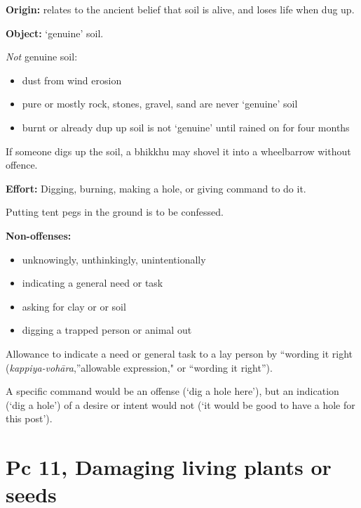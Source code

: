 \begin{multicols}{2}

\textbf{Origin:} relates to the ancient belief that soil is alive, and
loses life when dug up.

\textbf{Object:} `genuine' soil.

\emph{Not} genuine soil:

\begin{itemize}
\tightlist
\item
  dust from wind erosion
\item
  pure or mostly rock, stones, gravel, sand are never `genuine' soil
\item
  burnt or already dup up soil is not `genuine' until rained on for four
  months
\end{itemize}

If someone digs up the soil, a bhikkhu may shovel it into a wheelbarrow
without offence.

\textbf{Effort:} Digging, burning, making a hole, or giving command to
do it.

Putting tent pegs in the ground is to be confessed.

\columnbreak

\textbf{Non-offenses:}

\begin{itemize}
\tightlist
\item
  unknowingly, unthinkingly, unintentionally
\item
  indicating a general need or task
\item
  asking for clay or or soil
\item
  digging a trapped person or animal out
\end{itemize}

Allowance to indicate a need or general task to a lay person by
``wording it right (\emph{kappiya-vohāra},''allowable expression," or
``wording it right'').

A specific command would be an offense (`dig a hole here'), but an
indication (`dig a hole') of a desire or intent would not (`it would be
good to have a hole for this post').

\end{multicols}

\section{Pc 11, Damaging living plants or seeds}

